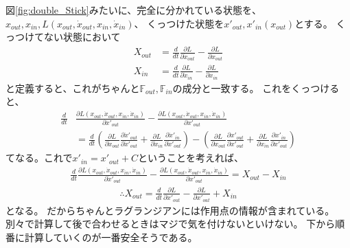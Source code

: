 \documentclass[a4paper,11pt]{jsarticle}
\begin{document}
図\ref{fig:double_Stick}みたいに、完全に分かれている状態を、
$x_{out}, x_{in}, L(x_{out},\dot{x}_{out},x_{in},\dot{x}_{in})$、
くっつけた状態を$x'_{out}, x'_{in}(x_{out})$とする。
くっつけてない状態において
\begin{align*}
  X_{out} &= \frac{d}{dt}\frac{\partial L}{\partial \dot{x}_{out}} - \frac{\partial L}{\partial x_{out}}
  \\ X_{in} &= \frac{d}{dt}\frac{\partial L}{\partial \dot{x}_{in}} - \frac{\partial L}{\partial x_{in}}
\end{align*}
と定義すると、これがちゃんと$\mathbb{F}_{out}, \mathbb{F}_{in}$の成分と一致する。
これをくっつけると、
\begin{align*}
  \frac{d}{dt}&\frac{\partial L(x_{out},\dot{x}_{out},x_{in},\dot{x}_{in})}{\partial \dot{x}'_{out}}
   - \frac{\partial L(x_{out},\dot{x}_{out},x_{in},\dot{x}_{in})}{\partial x'_{out}}
  \\ &= \frac{d}{dt}
  \left(\frac{\partial L}{\partial \dot{x}_{out}}\frac{\partial \dot{x}'_{out}}{\partial \dot{x}'_{out}}
   + \frac{\partial L}{\partial \dot{x}_{in}}\frac{\partial \dot{x}'_{in}}{\partial \dot{x}'_{out}}\right)
   - \left(\frac{\partial L}{\partial x_{out}}\frac{\partial x'_{out}}{\partial x'_{out}}
   + \frac{\partial L}{\partial x_{in}}\frac{\partial x'_{in}}{\partial x'_{out}}\right)
\end{align*}
てなる。これで$x'_{in} = x'_{out} + C$ということを考えれば、
\begin{align*}
  \frac{d}{dt}\frac{\partial L(x_{out},\dot{x}_{out},x_{in},\dot{x}_{in})}{\partial \dot{x}'_{out}}
   - \frac{\partial L(x_{out},\dot{x}_{out},x_{in},\dot{x}_{in})}{\partial x'_{out}}
   = X_{out} - X_{in}
\end{align*}
\begin{align*}
  \therefore X_{out} = \frac{d}{dt}\frac{\partial L}{\partial \dot{x}'_{out}}
  - \frac{\partial L}{\partial x'_{out}} + X_{in}
\end{align*}
となる。
だからちゃんとラグランジアンには作用点の情報が含まれている。
別々で計算して後で合わせるときはマジで気を付けないといけない。
下から順番に計算していくのが一番安全そうである。

\clearpage
\end{document}
